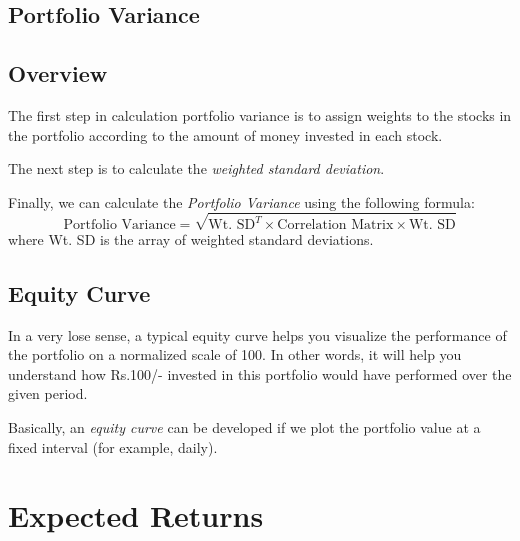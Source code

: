 
\subsection{Portfolio Variance}

\subsection{Overview}
The first step in calculation portfolio variance is to assign weights to the stocks in the portfolio according to the amount of money invested in each stock.

The next step is to calculate the \emph{weighted standard deviation}.


Finally, we can calculate the \emph{Portfolio Variance} using the following formula:
\[
  \textrm{Portfolio Variance} = \sqrt{\textrm{Wt. SD}^T \times \textrm{Correlation Matrix} \times \textrm{Wt. SD}}
\]
where Wt. SD is the array of weighted standard deviations.


\subsection{Equity Curve}
In a very lose sense, a typical equity curve helps you visualize the performance of the portfolio on a normalized scale of 100. In other words, it will help you understand how Rs.100/- invested in this portfolio would have performed over the given period.

Basically, an \emph{equity curve} can be developed if we plot the portfolio value at a fixed interval (for example, daily). 


\section{Expected Returns}

